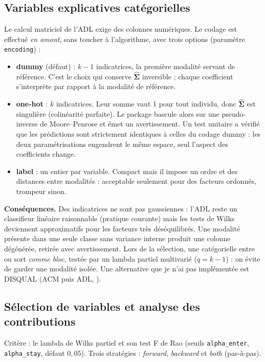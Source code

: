 \documentclass[10.5pt,a4paper]{article}
\newcommand{\code}[1]{\texttt{#1}}
\newcommand{\bm}[1]{\mathbf{#1}}
\begin{document}
\subsection{Variables explicatives cat\'egorielles}\label{sec:cat}
Le calcul matriciel de l'ADL exige des colonnes num\'eriques. Le codage est effectu\'e \emph{en amont}, sans toucher \`a l'algorithme, avec trois options (param\`etre \code{encoding}) :
\begin{itemize}
\item \textbf{dummy} (d\'efaut) : $k-1$ indicatrices, la premi\`ere modalit\'e servant de r\'ef\'erence. C'est le choix qui conserve $\hat{\bm\Sigma}$ inversible ; chaque coefficient s'interpr\`ete par rapport \`a la modalit\'e de r\'ef\'erence.
\item \textbf{one-hot} : $k$ indicatrices. Leur somme vaut 1 pour tout individu, donc $\hat{\bm\Sigma}$ est singuli\`ere (colinéarit\'e parfaite). Le package bascule alors sur une pseudo-inverse de Moore--Penrose et \'emet un avertissement. Un test unitaire a v\'erifi\'e que les pr\'edictions sont strictement identiques \`a celles du codage dummy : les deux param\'etrisations engendrent le m\^eme espace, seul l'aspect des coefficients change.
\item \textbf{label} : un entier par variable. Compact mais il impose un ordre et des distances entre modalit\'es : acceptable seulement pour des facteurs ordonn\'es, trompeur sinon.
\end{itemize}
\textbf{Cons\'equences.} Des indicatrices ne sont pas gaussiennes : l'ADL reste un classifieur lin\'eaire raisonnable (pratique courante) mais les tests de Wilks deviennent approximatifs pour les facteurs tr\`es d\'es\'equilibr\'es. Une modalit\'e pr\'esente dans une seule classe sans variance interne produit une colonne d\'eg\'en\'er\'ee, retir\'ee avec avertissement. Lors de la s\'election, une cat\'egorielle entre ou sort \emph{comme bloc}, test\'ee par un lambda partiel multivari\'e ($q=k-1$) : on \'evite de garder une modalit\'e isol\'ee. Une alternative que je n'ai pas impl\'ement\'ee est DISQUAL (ACM puis ADL, \cite{saporta}).

\subsection{S\'election de variables et analyse des contributions}\label{sec:select}
Crit\`ere : le lambda de Wilks partiel et son test F de Rao (seuils \code{alpha\_enter}, \code{alpha\_stay}, d\'efaut $0{,}05$). Trois strat\'egies : \emph{forward}, \emph{backward} et \emph{both} (pas-\`a-pas).
\end{document}
